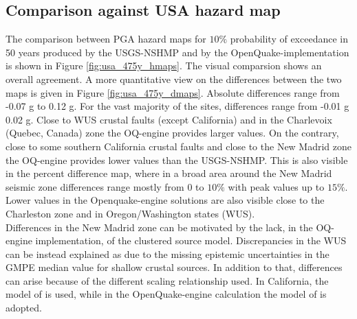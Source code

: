 \subsection{Comparison against USA hazard map}
The comparison between PGA hazard maps for $10\%$ probability of exceedance in 50 years produced by the USGS-NSHMP and by the OpenQuake-implementation is shown in Figure \ref{fig:usa_475y_hmaps}. The visual comparsion shows an overall agreement. A more quantitative view on the differences between the two maps is given in Figure \ref{fig:usa_475y_dmaps}. Absolute differences range from -0.07 g to 0.12 g. For the vast majority of the sites, differences range from -0.01 g 0.02 g. Close to WUS crustal faults (except California) and in the Charlevoix (Quebec, Canada) zone the OQ-engine provides larger values. On the contrary, close to some southern California crustal faults and close to the New Madrid zone the OQ-engine provides lower values than the USGS-NSHMP. This is also visible in the percent difference map, where in a broad area around the New Madrid seismic zone differences range mostly from $0$ to $10\%$ with peak values up to $15\%$. Lower values in the Openquake-engine solutions are also visible close to the Charleston zone and in Oregon/Washington states (WUS).\\
Differences in the New Madrid zone can be motivated by the  lack, in the OQ-engine implementation, of the clustered source model. Discrepancies in the WUS can be instead explained as due to the missing epistemic uncertainties in the GMPE median value for shallow crustal sources. In addition to that, differences can arise because of the different scaling relationship used. In California, the model of \cite{hanks2002} is used, while in the OpenQuake-engine calculation the model of \cite{wells1994} is adopted.